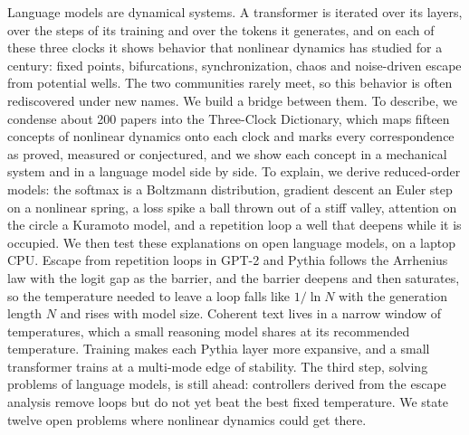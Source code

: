 Language models are dynamical systems. A transformer is iterated over its layers, over the steps of its training and over the tokens it generates, and on each of these three clocks it shows behavior that nonlinear dynamics has studied for a century: fixed points, bifurcations, synchronization, chaos and noise-driven escape from potential wells. The two communities rarely meet, so this behavior is often rediscovered under new names. We build a bridge between them. To describe, we condense about 200 papers into the Three-Clock Dictionary, which maps fifteen concepts of nonlinear dynamics onto each clock and marks every correspondence as proved, measured or conjectured, and we show each concept in a mechanical system and in a language model side by side. To explain, we derive reduced-order models: the softmax is a Boltzmann distribution, gradient descent an Euler step on a nonlinear spring, a loss spike a ball thrown out of a stiff valley, attention on the circle a Kuramoto model, and a repetition loop a well that deepens while it is occupied. We then test these explanations on open language models, on a laptop CPU. Escape from repetition loops in GPT-2 and Pythia follows the Arrhenius law with the logit gap as the barrier, and the barrier deepens and then saturates, so the temperature needed to leave a loop falls like $1/\ln N$ with the generation length $N$ and rises with model size. Coherent text lives in a narrow window of temperatures, which a small reasoning model shares at its recommended temperature. Training makes each Pythia layer more expansive, and a small transformer trains at a multi-mode edge of stability. The third step, solving problems of language models, is still ahead: controllers derived from the escape analysis remove loops but do not yet beat the best fixed temperature. We state twelve open problems where nonlinear dynamics could get there.

